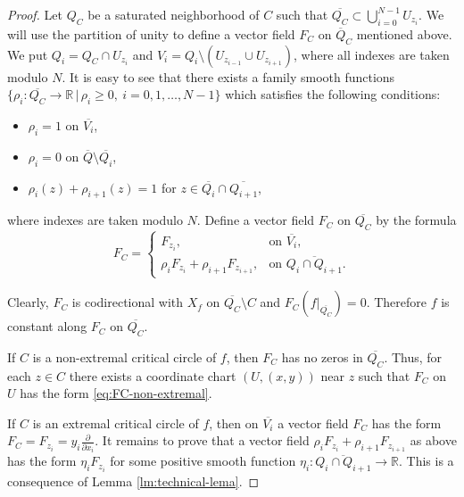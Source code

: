 \documentclass[10pt,reqno]{amsart}
\newcommand{\bbR}{\mathbb{R}}
\begin{document}
\begin{proof}
Let $Q_C$ be a saturated neighborhood of $C$ such that $\overline{Q_C}\subset \bigcup_{i = 0}^{N-1} U_{z_i}.$ We will use the partition of unity to define a  vector field $F_C$ on $\overline{Q}_C$ mentioned above.
We put $Q_i = Q_C\cap U_{z_i}$ and $V_i = Q_i\setminus (U_{z_{i-1}}\cup U_{z_{i+1}})$, where all indexes are taken modulo $N$. It is easy to see that there exists a family smooth functions $\{ \rho_i:\overline{Q_C}\to \bbR\,|\, \rho_i\geq 0,\ i =0,1,\ldots, N-1 \}$
which satisfies the following conditions:
\begin{itemize}
	\item $\rho_i = 1$ on $\overline{V_i}$,
	\item $\rho_i = 0$ on $\overline{Q}\setminus \overline{Q_{i}}$,
	\item $\rho_i(z) + \rho_{i+1}(z) = 1$ for $z\in \overline{Q_i}\cap \overline{Q_{i+1}}$,
\end{itemize}
where  indexes are taken modulo $N$. Define a vector field $F_C$ on $\overline{Q_C}$ by the formula
\begin{equation}\label{eq:F_C-formula}
	F_C =\begin{cases}
		F_{z_i}, &\text{on }\overline{V_i},\\
		\rho_iF_{z_i}+\rho_{i+1} F_{z_{i+1}}, &\text{on } \overline{Q_i\cap Q_{i+1}}.
	\end{cases}
\end{equation}








Clearly, $F_C$ is codirectional with $X_f$ on $\overline{Q_C}\setminus C$ and $F_C(f|_{\overline{Q_C}}) = 0$. Therefore $f$ is constant along $F_C$ on $\overline{Q_C}$.



If $C$ is a non-extremal critical circle of $f$, then $F_C$ has no zeros in $\overline{Q_C}$. Thus,  for each $z\in C$ there exists a coordinate chart $(U, (x,y))$ near $z$ such that $F_C$ on $U$ has the form \eqref{eq:FC-non-extremal}.


{If $C$ is an extremal critical circle of $f$, then on $\overline{V_i}$ a vector field $F_C$ has the form $F_C = F_{z_i} = y_i\frac{\partial}{\partial x_i}$. It remains to prove that a vector field 
$\rho_iF_{z_i}+\rho_{i+1} F_{z_{i+1}}$ as above has the form $\eta_{i} F_{z_{i}}$ for some positive smooth function $\eta_{i}:\overline{Q_i\cap Q_{i+1}}\to \bbR$. This is a consequence of  Lemma \ref{lm:technical-lema}.

}
\end{proof}
\end{document}
